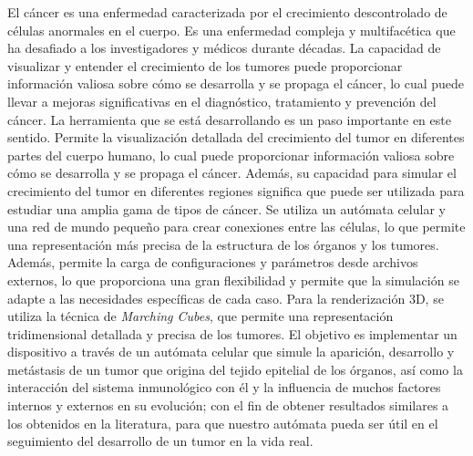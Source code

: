 \begin{resumen}
El cáncer es una enfermedad caracterizada por el crecimiento descontrolado de células anormales en el cuerpo. Es una enfermedad compleja y multifacética que ha desafiado a los investigadores y médicos durante décadas. La capacidad de visualizar y entender el crecimiento de los tumores puede proporcionar información valiosa sobre cómo se desarrolla y se propaga el cáncer, lo cual puede llevar a mejoras significativas en el diagnóstico, tratamiento y prevención del cáncer. La herramienta que se está desarrollando es un paso importante en este sentido. Permite la visualización detallada del crecimiento del tumor en diferentes partes del cuerpo humano, lo cual puede proporcionar información valiosa sobre cómo se desarrolla y se propaga el cáncer. Además, su capacidad para simular el crecimiento del tumor en diferentes regiones significa que puede ser utilizada para estudiar una amplia gama de tipos de cáncer. Se utiliza un autómata celular y una red de mundo pequeño para crear conexiones entre las células, lo que permite una representación más precisa de la estructura de los órganos y los tumores. Además, permite la carga de configuraciones y parámetros desde archivos externos, lo que proporciona una gran flexibilidad y permite que la simulación se adapte a las necesidades específicas de cada caso. Para la renderización 3D, se utiliza la técnica de \textit{Marching Cubes}, que permite una representación tridimensional detallada y precisa de los tumores. El objetivo es implementar un dispositivo a través de un autómata celular que simule la aparición, desarrollo y metástasis de un tumor que origina del tejido epitelial de los órganos, así como la interacción del sistema inmunológico con él y la influencia de muchos factores internos y externos en su evolución; con el fin de obtener resultados similares a los obtenidos en la literatura, para que nuestro autómata pueda ser útil en el seguimiento del desarrollo de un tumor en la vida real.
\end{resumen}


